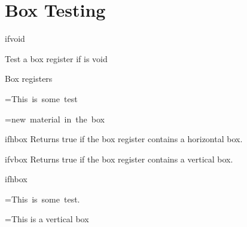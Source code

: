 \section{Box Testing}

\begin{docCommand}{ifvoid}{}{}

Test a box register if is void
\end{docCommand}

\begin{texexample}{Box registers}{}
\newbox\mybox

\ifvoid\mybox\TRUE\else\FALSE\fi

\setbox\mybox=\hbox{This is some test}

\ifvoid\mybox\TRUE\else\FALSE\fi

\box\mybox

\ifvoid\mybox\TRUE\else\FALSE\fi

\setbox\mybox=\hbox{new material in the box}

\copy\mybox

\ifvoid\mybox\TRUE\else\FALSE\fi

\end{texexample}

\begin{docCommand}{ifhbox}{}
Returns true if the box register contains a horizontal box.
\end{docCommand}

\begin{docCommand}{ifvbox}{}
Returns true if the box register contains a vertical box.
\end{docCommand}

\begin{texexample}{ifhbox}{}
\newbox\hororvertbox

\setbox\hororvertbox=\hbox{This is some test.}

\ifhbox\hororvertbox\TRUE\else\FALSE\fi

\setbox\hororvertbox=\vbox{This is a vertical box}

\ifhbox\hororvertbox\TRUE\else\FALSE\fi

\ifvbox\hororvertbox\TRUE\else\FALSE\fi
\end{texexample}



